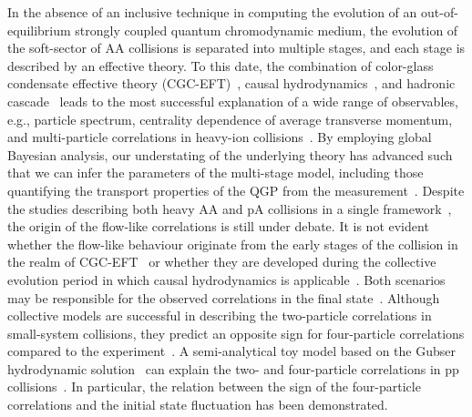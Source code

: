 In the absence of an inclusive technique in computing the evolution of an out-of-equilibrium strongly coupled quantum chromodynamic medium, the evolution of the soft-sector of AA collisions is separated into multiple stages, and each stage is described by an effective theory. To this date, the combination of color-glass condensate effective theory (CGC-EFT)~\cite{Schenke:2012wb,Schenke:2012hg}, causal hydrodynamics~\cite{Kolb:2003dz,Song:2007ux,Dusling:2007gi,Holopainen:2010gz,Schenke:2010rr,Romatschke:2007mq,Niemi:2015qia,Jeon:2015dfa,Romatschke:2017ejr}, and hadronic cascade~\cite{Bass:1998ca,Bleicher:1999xi,Weil:2016zrk} leads to the most successful explanation of a wide range of observables, e.g., particle spectrum, centrality dependence of average transverse momentum, and multi-particle correlations in heavy-ion collisions~\cite{ALICE:2016kpq,Acharya:2017gsw,Acharya:2017zfg,Acharya:2020taj,ALICE:2021klf,ALICE:2021adw,ALICE:2013mez,ALICE:2011ab}. By employing global Bayesian analysis, our understating of the underlying theory has advanced such that we can infer the parameters of the multi-stage model, including those quantifying the transport properties of the QGP from the measurement~\cite{Bernhard:2016tnd,Bernhard:2019bmu,Parkkila:2021tqq,Parkkila:2021yha}. Despite the studies describing both heavy AA and pA collisions in a single framework~\cite{Moreland:2018gsh}, the origin of the flow-like correlations is still under debate. It is not evident whether the flow-like behaviour originate from the early stages of the collision in the realm of CGC-EFT~\cite{Dusling:2012cg,Bzdak:2013zma} or whether they are developed during the collective evolution period in which causal hydrodynamics is applicable~\cite{Greif:2017bnr,Mantysaari:2017cni}. Both scenarios may be responsible for the observed correlations in the final state~\cite{Greif:2017bnr}. Although collective models are successful in describing the two-particle correlations in small-system collisions, they predict an opposite sign for four-particle correlations compared to the experiment~\cite{Khachatryan:2016txc,ATLAS:2017rtr}.  A semi-analytical toy model based on the Gubser hydrodynamic solution~\cite{Gubser:2010ze,Gubser:2010ui} can explain the two- and four-particle correlations in pp collisions~\cite{Taghavi:2019mqz}. In particular, the relation between the sign of the four-particle correlations and the initial state fluctuation has been demonstrated. 


